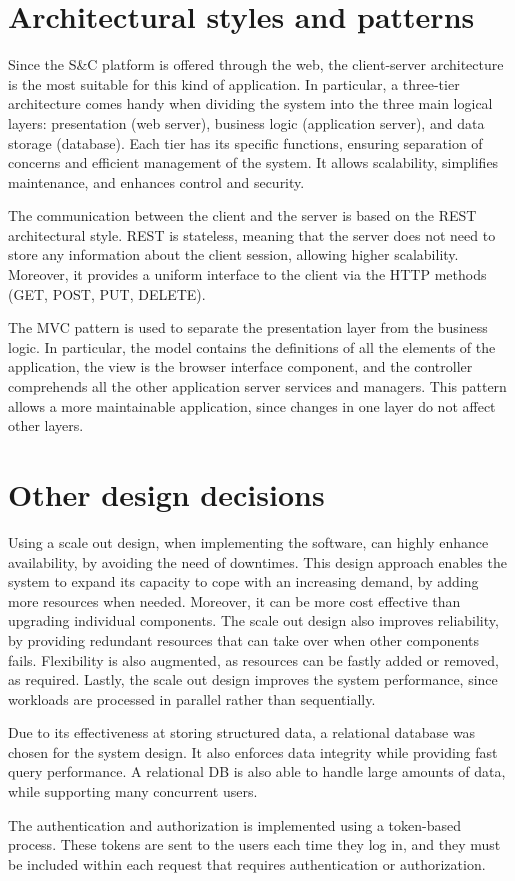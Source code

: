 \section{Architectural styles and patterns}

Since the S\&C platform is offered through the web, the client-server architecture is the most suitable for this kind of application.
In particular, a three-tier architecture comes handy when dividing the system into the three main logical layers: presentation (web server), business logic (application server), and data storage (database).
Each tier has its specific functions, ensuring separation of concerns and efficient management of the system.
It allows scalability, simplifies maintenance, and enhances control and security.

The communication between the client and the server is based on the REST architectural style.
REST is stateless, meaning that the server does not need to store any information about the client session, allowing higher scalability.
Moreover, it provides a uniform interface to the client via the HTTP methods (GET, POST, PUT, DELETE).

The MVC pattern is used to separate the presentation layer from the business logic.
In particular, the model contains the definitions of all the elements of the application, the view is the browser interface component, and the controller comprehends all the other application server services and managers.
This pattern allows a more maintainable application, since changes in one layer do not affect other layers.

\section{Other design decisions}

Using a scale out design, when implementing the software, can highly enhance availability, by avoiding the need of downtimes.
This design approach enables the system to expand its capacity to cope with an increasing demand, by adding more resources when needed.
Moreover, it can be more cost effective than upgrading individual components.
The scale out design also improves reliability, by providing redundant resources that can take over when other components fails.
Flexibility is also augmented, as resources can be fastly added or removed, as required.
Lastly, the scale out design improves the system performance, since workloads are processed in parallel rather than sequentially.

Due to its effectiveness at storing structured data, a relational database was chosen for the system design.
It also enforces data integrity while providing fast query performance.
A relational DB is also able to handle large amounts of data, while supporting many concurrent users.

The authentication and authorization is implemented using a token-based process.
These tokens are sent to the users each time they log in, and they must be included within each request that requires authentication or authorization.

